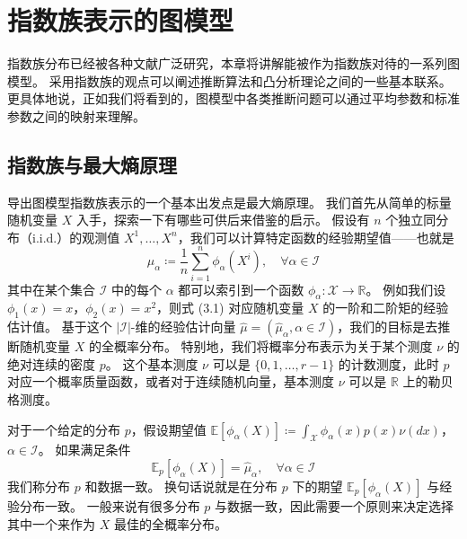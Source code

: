 \chapter{指数族表示的图模型}

指数族分布已经被各种文献广泛研究，本章将讲解能被作为指数族对待的一系列图模型。
采用指数族的观点可以阐述推断算法和凸分析理论之间的一些基本联系。
更具体地说，正如我们将看到的，图模型中各类推断问题可以通过平均参数和标准参数之间的映射来理解。

\section{指数族与最大熵原理}

导出图模型指数族表示的一个基本出发点是最大熵原理。
我们首先从简单的标量随机变量 $X$ 入手，探索一下有哪些可供后来借鉴的启示。
假设有 $n$ 个独立同分布（i.i.d.）的观测值 $X^1, \dots, X^n$，我们可以计算特定函数的经验期望值——也就是
\begin{equation}
    \hat{\mu}_{\alpha} \coloneqq \frac{1}{n}\sum_{i = 1}^n\phi_{\alpha}(X^i), \quad \forall \alpha \in \mathcal{I}
\end{equation}
其中在某个集合 $\mathcal{I}$ 中的每个 $\alpha$ 都可以索引到一个函数 $\phi_{\alpha}: \mathcal{X} \rightarrow \mathbb{R}$。
例如我们设 $\phi_1(x) = x$，$\phi_2(x) = x^2$，则式 (3.1) 对应随机变量 $X$ 的一阶和二阶矩的经验估计值。
基于这个 $|\mathcal{I}|$-维的经验估计向量 $\hat{\mu} = (\hat{\mu}_{\alpha}, \alpha \in \mathcal{I})$，我们的目标是去推断随机变量 $X$ 的全概率分布。
特别地，我们将概率分布表示为关于某个测度 $\nu$ 的绝对连续的密度 $p$。
这个基本测度 $\nu$ 可以是 $\{0, 1, \dots, r-1\}$ 的计数测度，此时 $p$ 对应一个概率质量函数，或者对于连续随机向量，基本测度 $\nu$ 可以是 $\mathbb{R}$ 上的勒贝格测度。

对于一个给定的分布 $p$，假设期望值 $\mathbb{E}[\phi_{\alpha}(X)] \coloneqq \int_{\mathcal{X}}\phi_{\alpha}(x)p(x)\nu(dx)$，$\alpha \in \mathcal{I}$。
如果满足条件
$$\mathbb{E}_p[\phi_{\alpha}(X)] = \hat{\mu}_{\alpha}, \quad \forall \alpha \in  \mathcal{I}$$
我们称分布 $p$ 和数据一致。
换句话说就是在分布 $p$ 下的期望 $\mathbb{E}_p[\phi_{\alpha}(X)]$ 与经验分布一致。
一般来说有很多分布 $p$ 与数据一致，因此需要一个原则来决定选择其中一个来作为 $X$ 最佳的全概率分布。

